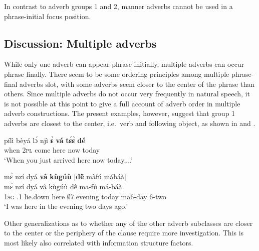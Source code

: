 \noindent In contrast to adverb groups 1 and 2, manner adverbs cannot be used in a phrase-initial focus position.

\subsection{Discussion: Multiple adverbs} 
\label{sec:MultiADV}

While only one adverb can appear phrase initially, multiple adverbs can occur phrase finally. 
There seem to be some ordering principles among multiple phrase-final adverbs slot, with some adverbs seem closer to the center of the phrase than others. Since multiple adverbs do not occur very frequently in natural speech, it is not possible at this point to give a full account of adverb order in multiple adverb constructions. The present examples, however, suggest that group 1 adverbs are closest to the center, i.e.\ verb and following object, as shown in  and .


\ea \label{ADVM1}
  \gll pílì bèyá lɔ́ njì {\bfseries ɛ̀} {\bfseries vá} {\bfseries tɛ́ɛ̀} {\bfseries dé}  \\
         when 2\textsc{pl} {\RETRO} come {\LOC} here now today  \\
    \trans `When you just arrived here now today,...'
\z

\ea \label{ADVM2}
  \glll  mɛ̀ nzí dyá {\bfseries vâ} {\bfseries kùgúù} [{\bfseries dẽ̂} màfú mábáà] \\
        mɛ̀ nzí dyá vâ kùgúù {\db}dẽ̂ ma-fú má-báà. \\
          1\textsc{sg} {\PROG}.{\PST}1 lie.down here $\emptyset$7.evening {\db}today ma6-day 6-two  \\
    \trans `I was here in the evening two days ago.'
\z

\noindent Other generalizations as to whether any of the other adverb subclasses are closer to the center or the periphery of the clause require more investigation. This is most likely also correlated with information structure factors.























